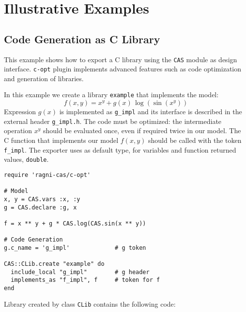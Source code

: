 \section{Illustrative Examples}
\label{sec:examples}

\subsection{Code Generation as C Library}
This example shows how to export a C library using the \texttt{CAS} module as design interface. \texttt{c-opt} plugin implements advanced features such as code optimization and generation of libraries.

In this example we create a library \texttt{example} that implements the model:
\begin{equation}
f(x, y) = x^y + g(x)\, \log(\sin(x^y))
\end{equation}
Expression $g(x)$ is implemented as \texttt{g\_impl} and its interface is described in the external header \texttt{g\_impl.h}. The code must be optimized: the intermediate operation $x^y$ should be evaluated once, even if required twice in our model. The C function that implements our model $f(x,y)$ should be called with the token \texttt{f\_impl}. The exporter uses as default type, for variables and function returned values, \texttt{double}.

\begin{lstlisting}[caption={Calling optimized-C exporter for library generation},label={code:example-exporting-C-1}]
require 'ragni-cas/c-opt'

# Model
x, y = CAS.vars :x, :y
g = CAS.declare :g, x

f = x ** y + g * CAS.log(CAS.sin(x ** y))

# Code Generation
g.c_name = 'g_impl'             # g token

CAS::CLib.create "example" do
  include_local "g_impl"        # g header
  implements_as "f_impl", f     # token for f
end
\end{lstlisting}
Library created by class \texttt{CLib} contains the following code:

\noindent%
  \begin{minipage}{.5\textwidth}
    
  \end{minipage}\hfill
  \begin{minipage}{.5\textwidth}
    
  \end{minipage}

